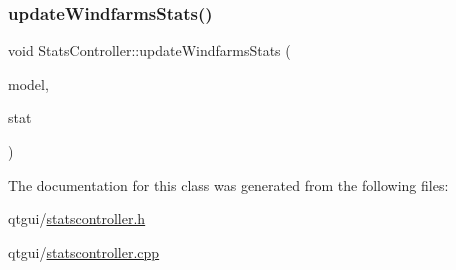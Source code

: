 \mbox{\label{class_stats_controller_a0eda2aa41b725b775e237a17df8a480b}} 
\subsubsection{\texorpdfstring{updateWindfarmsStats()}{updateWindfarmsStats()}}
{\footnotesize\ttfamily void Stats\+Controller\+::update\+Windfarms\+Stats (\begin{DoxyParamCaption}\item[{\mbox{\hyperlink{class_displace_model}{Displace\+Model}} $\ast$}]{model,  }\item[{\mbox{\hyperlink{namespacedisplace_1_1plot_a8b9bfd155809bb203b09c572304a62c3}{displace\+::plot\+::\+Windfarms\+Stat}}}]{stat }\end{DoxyParamCaption})\hspace{0.3cm}{\ttfamily [protected]}}



The documentation for this class was generated from the following files\+:\begin{DoxyCompactItemize}
\item 
qtgui/\mbox{\hyperlink{statscontroller_8h}{statscontroller.\+h}}\item 
qtgui/\mbox{\hyperlink{statscontroller_8cpp}{statscontroller.\+cpp}}\end{DoxyCompactItemize}
